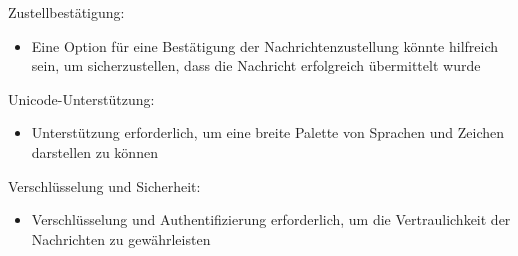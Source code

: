 \noindent Zustellbestätigung:
\begin{itemize}
    \item Eine Option für eine Bestätigung der Nachrichtenzustellung könnte 
    hilfreich sein, um sicherzustellen, dass die Nachricht erfolgreich 
    übermittelt wurde
\end{itemize}


\noindent Unicode-Unterstützung:
\begin{itemize}
    \item Unterstützung erforderlich, um eine breite Palette von Sprachen und
    Zeichen darstellen zu können
\end{itemize}

\noindent Verschlüsselung und Sicherheit:
\begin{itemize}
    \item Verschlüsselung und Authentifizierung erforderlich, um 
    die Vertraulichkeit der Nachrichten zu gewährleisten
\end{itemize}
